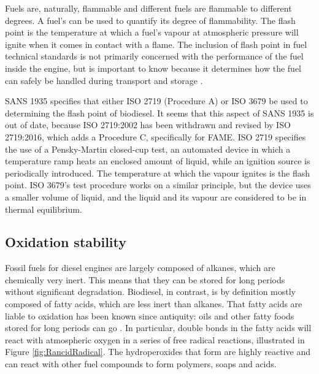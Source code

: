 Fuels are, naturally, flammable and different fuels are flammable to different
degrees. A fuel's  can be used to quantify its degree of
flammability. The flash point is the temperature at which a fuel's vapour at
atmospheric pressure will ignite when it comes in contact with a flame. The
inclusion of flash point in fuel technical standards is not primarily concerned
with the performance of the fuel inside the engine, but is important to know
because it determines how the fuel can safely be handled during transport and
storage \autocite{WFCC2009}.

SANS 1935 specifies that either ISO 2719 (Procedure A) or ISO 3679 be used to
determining the flash point of biodiesel. It seems that this aspect of SANS 1935 is out of
date, because ISO 2719:2002 has been withdrawn and revised by ISO 2719:2016,
which adds a Procedure C, specifically for FAME. ISO 2719 specifies the use of a
Pensky-Martin closed-cup test, an automated device in which a temperature ramp
heats an enclosed amount of liquid, while an ignition source is periodically
introduced. The temperature at which the vapour ignites is the flash point. ISO
3679's test procedure works on a similar principle, but the device uses a
smaller volume of liquid, and the liquid and its vapour are considered to be in
thermal equilibrium.

\subsection{Oxidation stability}
\label{sec:Rancimat}

Fossil fuels for diesel engines are largely composed of alkanes, which are
chemically very inert. This means that they can be stored for long periods
without significant degradation. Biodiesel, in contrast, is by definition
\autocite[Paragraph 4.1.1]{SANS1935} mostly composed of fatty acids, which are
less inert than alkanes. That fatty acids are liable to oxidation has been known
since antiquity: oils and other fatty foods stored for long periods can go
. In particular, double bonds in the fatty acids will react with
atmospheric oxygen \autocite{Velasco2010} in a series of free radical reactions,
illustrated in Figure \ref{fig:RancidRadical}. The hydroperoxides that form are
highly reactive and can react with other fuel compounds to form polymers, soaps
and acids.

